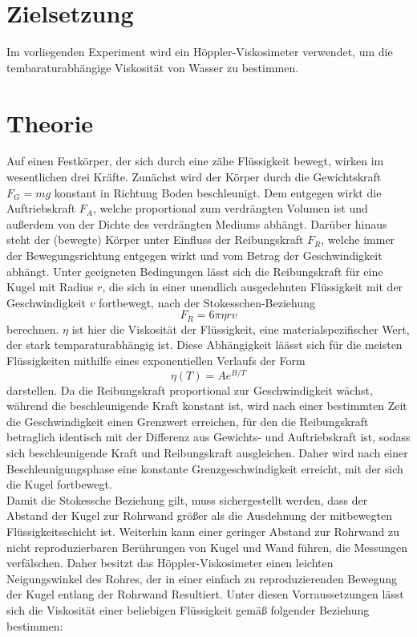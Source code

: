 \section{Zielsetzung}
\label{sec:zielsetzung}
Im vorliegenden Experiment wird ein Höppler-Viskosimeter verwendet, um die  tembaraturabhängige Viskosität von Wasser zu bestimmen.
\section{Theorie}
\label{sec:theorie}
Auf einen Festkörper, der sich durch eine zähe Flüssigkeit bewegt, wirken im wesentlichen drei Kräfte. Zunächst wird der Körper durch die Gewichtskraft $F_G=mg$ konstant in Richtung Boden beschleunigt. Dem entgegen wirkt die Auftriebskraft $F_A$, welche proportional zum verdrängten Volumen ist und außerdem von der Dichte des verdrängten Mediums abhängt. Darüber hinaus steht der (bewegte) Körper unter Einfluss der Reibungskraft $F_R$, welche immer der Bewegungsrichtung entgegen wirkt und vom Betrag der Geschwindigkeit abhängt. Unter geeigneten Bedingungen lässt sich die Reibungskraft für eine Kugel mit Radius $r$, die sich in einer unendlich ausgedehnten Flüssigkeit mit der Geschwindigkeit $v$ fortbewegt, nach der Stokesschen-Beziehung
\begin{equation}
F_R=6\pi \eta rv
\end{equation}
berechnen. $\eta$ ist hier die Viskosität der Flüssigkeit, eine materialspezifischer Wert, der stark temparaturabhängig ist. Diese Abhängigkeit läässt sich für die meisten Flüssigkeiten mithilfe eines exponentiellen Verlaufs der Form
\begin{equation}
    \label{eq:theoriekurve}
\eta (T) = Ae^{B/T}
\end{equation}
darstellen. Da die Reibungskraft proportional zur Geschwindigkeit wächst, während die beschleunigende Kraft konstant ist, wird nach einer bestimmten Zeit die Geschwindigkeit einen Grenzwert erreichen, für den die Reibungskraft betraglich identisch mit der Differenz aus Gewichts- und Auftriebskraft ist, sodass sich beschleunigende Kraft und Reibungskraft ausgleichen. Daher wird nach einer Beschleunigungsphase eine konstante Grenzgeschwindigkeit erreicht, mit der sich die Kugel fortbewegt. \\
Damit die Stokessche Beziehung gilt, muss sichergestellt werden, dass der Abstand der Kugel zur Rohrwand größer als die Ausdehnung der mitbewegten Flüssigkeitsschicht ist. Weiterhin kann einer geringer Abstand zur Rohrwand zu nicht reproduzierbaren Berührungen von Kugel und Wand führen, die Messungen verfälschen. Daher besitzt das Höppler-Viskosimeter einen leichten Neigungswinkel des Rohres, der in einer einfach zu reproduzierenden Bewegung der Kugel entlang der Rohrwand Resultiert. Unter diesen Vorraussetzungen lässt sich die Viskosität einer beliebigen Flüssigkeit gemäß folgender Beziehung bestimmen:
